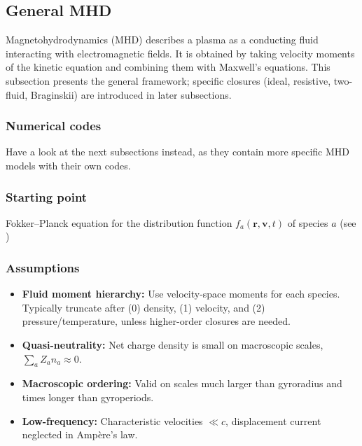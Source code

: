 \documentclass[10pt]{book}
\begin{document}
\subsection{General MHD}

Magnetohydrodynamics (MHD) describes a plasma as a conducting fluid interacting with electromagnetic fields. 
It is obtained by taking velocity moments of the kinetic equation and combining them with Maxwell’s equations. 
This subsection presents the general framework; specific closures (ideal, resistive, two-fluid, Braginskii) are introduced in later subsections.

\subsubsection{Numerical codes}
Have a look at the next subsections instead, as they contain more specific MHD models with their own codes.

\subsubsection{Starting point}
Fokker–Planck equation for the distribution function $f_a(\mathbf{r},\mathbf{v},t)$ of species $a$ (see )

\subsubsection{Assumptions}
\begin{itemize}
    \item \textbf{Fluid moment hierarchy:} Use velocity-space moments for each species. 
    Typically truncate after (0) density, (1) velocity, and (2) pressure/temperature, unless higher-order closures are needed.
    \item \textbf{Quasi-neutrality:} Net charge density is small on macroscopic scales, $\sum_a Z_a n_a \approx 0$.
    \item \textbf{Macroscopic ordering:} Valid on scales much larger than gyroradius and times longer than gyroperiods.
    \item \textbf{Low-frequency:} Characteristic velocities $\ll c$, displacement current neglected in Ampère’s law.
\end{itemize}
\end{document}
